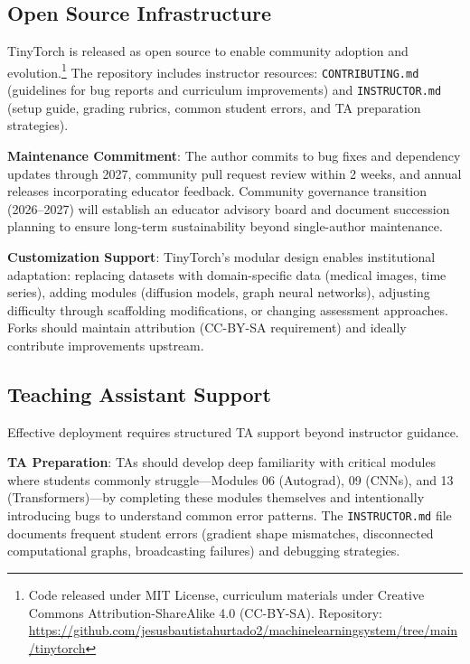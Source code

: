 \documentclass[10pt,twocolumn]{article}
\begin{document}
\subsection{Open Source Infrastructure}
\label{subsec:opensource}

TinyTorch is released as open source to enable community adoption and evolution.\footnote{Code released under MIT License, curriculum materials under Creative Commons Attribution-ShareAlike 4.0 (CC-BY-SA). Repository: \url{https://github.com/jesusbautistahurtado2/machinelearningsystem/tree/main/tinytorch}} The repository includes instructor resources: \texttt{CONTRIBUTING.md} (guidelines for bug reports and curriculum improvements) and \texttt{INSTRUCTOR.md} (setup guide, grading rubrics, common student errors, and TA preparation strategies).

\textbf{Maintenance Commitment}: The author commits to bug fixes and dependency updates through 2027, community pull request review within 2 weeks, and annual releases incorporating educator feedback. Community governance transition (2026--2027) will establish an educator advisory board and document succession planning to ensure long-term sustainability beyond single-author maintenance.

\textbf{Customization Support}: TinyTorch's modular design enables institutional adaptation: replacing datasets with domain-specific data (medical images, time series), adding modules (diffusion models, graph neural networks), adjusting difficulty through scaffolding modifications, or changing assessment approaches. Forks should maintain attribution (CC-BY-SA requirement) and ideally contribute improvements upstream.

\subsection{Teaching Assistant Support}
\label{subsec:ta-support}

Effective deployment requires structured TA support beyond instructor guidance.

\textbf{TA Preparation}: TAs should develop deep familiarity with critical modules where students commonly struggle---Modules 06 (Autograd), 09 (CNNs), and 13 (Transformers)---by completing these modules themselves and intentionally introducing bugs to understand common error patterns. The \texttt{INSTRUCTOR.md} file documents frequent student errors (gradient shape mismatches, disconnected computational graphs, broadcasting failures) and debugging strategies.
\end{document}
